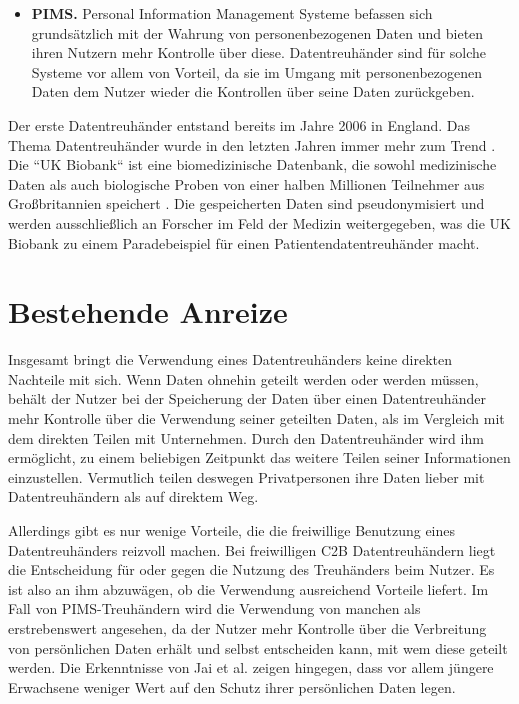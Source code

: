 \documentclass[
	fontsize=12pt,
	headings=small,
	parskip=half,           %
	bibliography=totoc,
	numbers=noenddot,       %
	open=any,               %
]{scrreprt}
\begin{document}
\begin{itemize}
    \item \textbf{PIMS.} Personal Information Management Systeme befassen sich grundsätzlich mit der Wahrung von personenbezogenen Daten und bieten ihren Nutzern mehr Kontrolle über diese.  Datentreuhänder sind für solche Systeme vor allem von Vorteil, da sie im Umgang mit personenbezogenen Daten dem Nutzer wieder die Kontrollen über seine Daten zurückgeben.
\end{itemize}

Der erste Datentreuhänder entstand bereits im Jahre 2006 in England. Das Thema Datentreuhänder wurde in den letzten Jahren immer mehr zum Trend \cite{dt-richter2020ddvtalk}. Die ``UK Biobank`` ist eine biomedizinische Datenbank, die sowohl medizinische Daten als auch biologische Proben von einer halben Millionen Teilnehmer aus Großbritannien speichert \cite{dt-hardinges2018data}. Die gespeicherten Daten sind pseudonymisiert und werden ausschließlich an Forscher im Feld der Medizin weitergegeben, was die UK Biobank zu einem Paradebeispiel für einen Patientendatentreuhänder macht.


\section{Bestehende Anreize}
Insgesamt bringt die Verwendung eines Datentreuhänders keine direkten Nachteile mit sich. Wenn Daten ohnehin geteilt werden oder werden müssen, behält der Nutzer bei der Speicherung der Daten über einen Datentreuhänder mehr Kontrolle über die Verwendung seiner geteilten Daten, als im Vergleich mit dem direkten Teilen mit Unternehmen. Durch den Datentreuhänder wird ihm ermöglicht, zu einem beliebigen Zeitpunkt das weitere Teilen seiner Informationen einzustellen. Vermutlich teilen deswegen Privatpersonen ihre Daten lieber mit Datentreuhändern als auf direktem Weg. \cite{dt-tresor24study}

Allerdings gibt es nur wenige Vorteile, die die freiwillige Benutzung eines Datentreuhänders reizvoll machen. Bei freiwilligen C2B Datentreuhändern liegt die Entscheidung für oder gegen die Nutzung des Treuhänders beim Nutzer. Es ist also an ihm abzuwägen, ob die Verwendung ausreichend Vorteile liefert. Im Fall von PIMS-Treuhändern wird die Verwendung von manchen als erstrebenswert angesehen, da der Nutzer mehr Kontrolle über die Verbreitung von persönlichen Daten erhält und selbst entscheiden kann, mit wem diese geteilt werden. Die Erkenntnisse von Jai et al. \cite{dt-jai2016privacy} zeigen hingegen, dass vor allem jüngere Erwachsene weniger Wert auf den Schutz ihrer persönlichen Daten legen.
\end{document}
